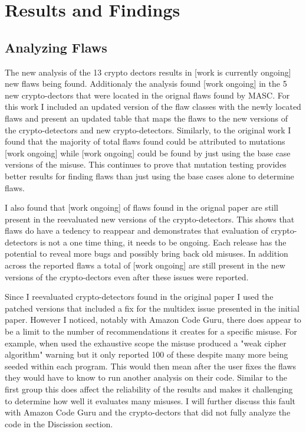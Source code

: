 \chapter{Results and Findings}
\label{chap_results}

\section{Analyzing Flaws}
\label{ch5:sec:flaws}

\begin{sloppypar}


\end{sloppypar}


The new analysis of the 13 crypto dectors results in [work is currently ongoing] new flaws being found. Additionaly the analysis found [work ongoing] in the 5 new crypto-dectors that were located in the orignal flaws found by MASC. For this work I included an updated version of the flaw classes with the newly located flaws and present an updated table that maps the flaws to the new versions of the crypto-detectors and new crypto-detectors. Similarly, to the original work I found that the majority of total flaws found could be attributed to mutations [work ongoing] while [work ongoing] could be found by just using the base case versions of the misuse. This continues to prove that mutation testing provides better results for finding flaws than just using the base cases alone to determine flaws.

I also found that [work ongoing] of flaws found in the orignal paper are still present in the reevaluated new versions of the crypto-detectors. This shows that flaws do have a tedency to reappear and demonstrates that evaluation of crypto-detectors is not a one time thing, it needs to be ongoing. Each release has the potential to reveal more bugs and possibly bring back old misuses. In addition across the reported flaws a total of [work ongoing] are still present in the new versions of the crypto-dectors even after these issues were reported.

Since I reevaluated crypto-detectors found in the original paper I used the patched versions that included a fix for the multidex issue presented in the initial paper. However I noticed, notably with Amazon Code Guru, there does appear to be a limit to the number of recommendations it creates for a specific misuse. For example, when used the exhaustive scope the misuse produced a "weak cipher algorithm" warning but it only reported 100 of these despite many more being seeded within each program. This would then mean after the user fixes the flaws they would have to know to run another analysis on their code. Similar to the first group this does affect the reliability of the results and makes it challenging to determine how well it evaluates many misuses. I will further discuss this fault with Amazon Code Guru and the crypto-dectors that did not fully analyze the code in the Discission section. 

